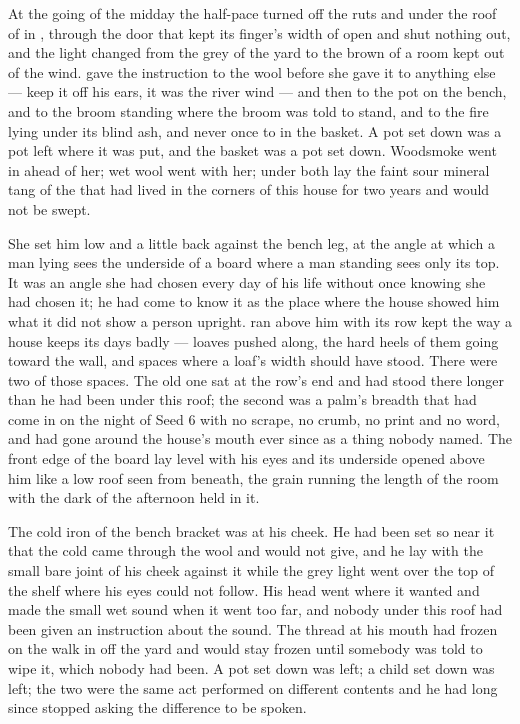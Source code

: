 At the going of the midday the half-pace turned off the ruts and under the roof of  in , through the door that kept its finger's width of open and shut nothing out, and the light changed from the grey of the yard to the brown of a room kept out of the wind.  gave the instruction to the wool before she gave it to anything else --- keep it off his ears, it was the river wind --- and then to the pot on the bench, and to the broom standing where the broom was told to stand, and to the fire lying under its blind ash, and never once to  in the basket. A pot set down was a pot left where it was put, and the basket was a pot set down. Woodsmoke went in ahead of her; wet wool went with her; under both lay the faint sour mineral tang of the  that had lived in the corners of this house for two years and would not be swept.

She set him low and a little back against the bench leg, at the angle at which a man lying sees the underside of a board where a man standing sees only its top. It was an angle she had chosen every day of his life without once knowing she had chosen it; he had come to know it as the place where the house showed him what it did not show a person upright.  ran above him with its row kept the way a house keeps its days badly --- loaves pushed along, the hard heels of them going toward the wall, and spaces where a loaf's width should have stood. There were two of those spaces. The old one sat at the row's end and had stood there longer than he had been under this roof; the second was a palm's breadth that had come in on the night of Seed 6 with no scrape, no crumb, no print and no word, and had gone around the house's mouth ever since as a thing nobody named. The front edge of the board lay level with his eyes and its underside opened above him like a low roof seen from beneath, the grain running the length of the room with the dark of the afternoon held in it.

The cold iron of the bench bracket was at his cheek. He had been set so near it that the cold came through the wool and would not give, and he lay with the small bare joint of his cheek against it while the grey light went over the top of the shelf where his eyes could not follow. His head went where it wanted and made the small wet sound when it went too far, and nobody under this roof had been given an instruction about the sound. The thread at his mouth had frozen on the walk in off the yard and would stay frozen until somebody was told to wipe it, which nobody had been. A pot set down was left; a child set down was left; the two were the same act performed on different contents and he had long since stopped asking the difference to be spoken.

